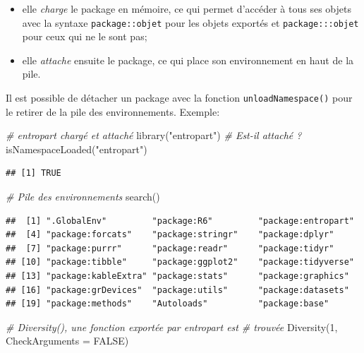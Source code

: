\documentclass[
  11pt,
  french,
  a4paper,
  extrafontsizes,onecolumn,openright
  ]{memoir}
\newenvironment{Shaded}{\begin{snugshade}}{\end{snugshade}}
\newcommand{\AttributeTok}[1]{\textcolor[rgb]{0.77,0.63,0.00}{#1}}
\newcommand{\CommentTok}[1]{\textcolor[rgb]{0.56,0.35,0.01}{\textit{#1}}}
\newcommand{\ConstantTok}[1]{\textcolor[rgb]{0.00,0.00,0.00}{#1}}
\newcommand{\DecValTok}[1]{\textcolor[rgb]{0.00,0.00,0.81}{#1}}
\newcommand{\FunctionTok}[1]{\textcolor[rgb]{0.00,0.00,0.00}{#1}}
\newcommand{\NormalTok}[1]{#1}
\newcommand{\StringTok}[1]{\textcolor[rgb]{0.31,0.60,0.02}{#1}}
\providecommand{\tightlist}{%
  \setlength{\itemsep}{0pt}\setlength{\parskip}{0pt}}
\begin{document}
\begin{itemize}
\tightlist
\item
  elle \emph{charge} le package en mémoire, ce qui permet d'accéder à tous ses objets avec la syntaxe \texttt{package::objet} pour les objets exportés et \texttt{package:::objet} pour ceux qui ne le sont pas;
\item
  elle \emph{attache} ensuite le package, ce qui place son environnement en haut de la pile.
\end{itemize}

Il est possible de détacher un package avec la fonction \texttt{unloadNamespace()} pour le retirer de la pile des environnements.
Exemple:

\scriptsize

\begin{Shaded}
\begin{Highlighting}[]
\CommentTok{\# entropart chargé et attaché}
\FunctionTok{library}\NormalTok{(}\StringTok{"entropart"}\NormalTok{)}
\CommentTok{\# Est{-}il attaché ?}
\FunctionTok{isNamespaceLoaded}\NormalTok{(}\StringTok{"entropart"}\NormalTok{)}
\end{Highlighting}
\end{Shaded}

\begin{verbatim}
## [1] TRUE
\end{verbatim}

\begin{Shaded}
\begin{Highlighting}[]
\CommentTok{\# Pile des environnements}
\FunctionTok{search}\NormalTok{()}
\end{Highlighting}
\end{Shaded}

\begin{verbatim}
##  [1] ".GlobalEnv"         "package:R6"         "package:entropart" 
##  [4] "package:forcats"    "package:stringr"    "package:dplyr"     
##  [7] "package:purrr"      "package:readr"      "package:tidyr"     
## [10] "package:tibble"     "package:ggplot2"    "package:tidyverse" 
## [13] "package:kableExtra" "package:stats"      "package:graphics"  
## [16] "package:grDevices"  "package:utils"      "package:datasets"  
## [19] "package:methods"    "Autoloads"          "package:base"
\end{verbatim}

\begin{Shaded}
\begin{Highlighting}[]
\CommentTok{\# Diversity(), une fonction exportée par entropart est}
\CommentTok{\# trouvée}
\FunctionTok{Diversity}\NormalTok{(}\DecValTok{1}\NormalTok{, }\AttributeTok{CheckArguments =} \ConstantTok{FALSE}\NormalTok{)}
\end{Highlighting}
\end{Shaded}
\end{document}
